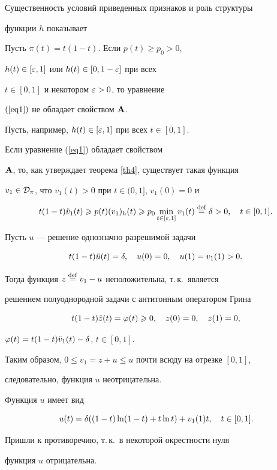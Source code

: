 Существенность условий приведенных признаков и роль структуры


функции $h$ показывает





\begin{thm}


Пусть $\pi(t)=t(1-t)$. Если $p(t)\ge p_0>0$,


$h(t)\in[\varepsilon,1]$ или $h(t)\in[0,1-\varepsilon]$ при всех


$t\in[0,1]$ и некотором $\varepsilon>0$, то уравнение


$(\ref{eq1})$ не обладает свойством $\bold A$.


\end{thm}





\begin{pf}


Пусть, например, $h(t)\in[\varepsilon,1]$ при всех $t\in[0,1]$.


Если уравнение (\ref{eq1}) обладает свойством


$\bold A$, то, как утверждает теорема \ref{th4}, существует такая функция


$v_1\in{\cal D}_\pi$, что $v_1(t)>0$ при $t\in(0,1]$, $v_1(0)=0$ и


$$


t(1-t)\Ddot v_1(t)\ge p(t)(v_{1})_h(t)\ge


p_0\min_{t\in[\e,1]}v_1(t)\df \d>0,\q t\in[0,1].


$$





Пусть $u$ --- решение однозначно разрешимой задачи


$$


t(1-t)\Ddot u(t)=\d,\q u(0)=0,\q u(1)=v_1(1)>0.


$$


Тогда функция $z\overset{\mathrm{def}}{=}{} v_1-u$ неположительна, т.\,к.~является


решением полуоднородной задачи с антитонным оператором Грина


$$


t(1-t)\Ddot z(t)=\phi(t)\ge0,\q z(0)=0,\q z(1)=0,


$$


$\varphi(t)=t(1-t)\Ddot v_1(t)-\delta$, $t\in[0,1]$.





Таким образом, $0\le v_1=z+u\le u$ почти всюду на отрезке $[0,1]$,


следовательно, функция $u$ неотрицательна.


Функция $u$ имеет вид


$$


u(t)=\d((1-t)\ln(1-t)+t\ln t)+v_1(1)t,\q t\in[0,1].


$$


Пришли к противоречию, т.\,к.~в некоторой окрестности нуля


функция $u$ отрицательна.


\end{pf}





